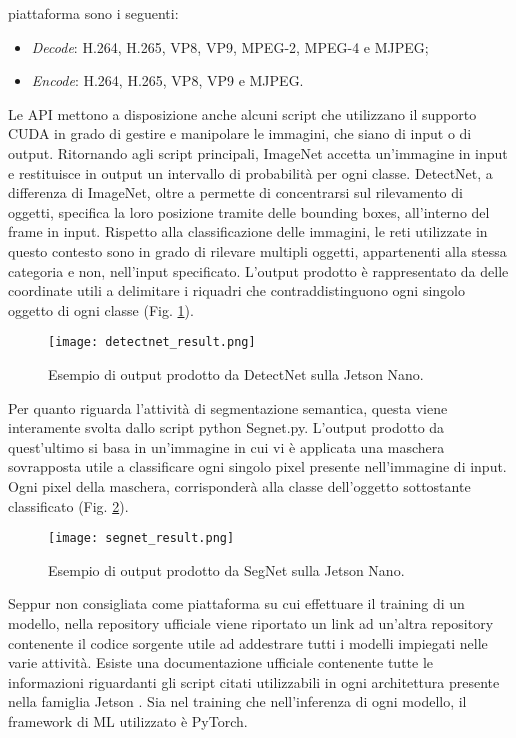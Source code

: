 piattaforma sono i seguenti:
\begin{itemize}
    \item \emph{Decode}: H.264, H.265, VP8, VP9, MPEG-2, MPEG-4 e MJPEG;
    \item \emph{Encode}: H.264, H.265, VP8, VP9 e MJPEG.
\end{itemize}
Le API mettono a disposizione anche alcuni script che utilizzano il supporto 
CUDA in grado di gestire e manipolare le immagini, che siano di input o 
di output. Ritornando agli script principali, ImageNet accetta un'immagine 
in input e restituisce in output un intervallo di probabilità per ogni classe. 
DetectNet, a differenza di ImageNet, oltre a permette di concentrarsi sul rilevamento 
di oggetti, specifica la loro posizione tramite delle bounding boxes, 
all'interno del frame in input. Rispetto alla classificazione delle immagini, 
le reti utilizzate in questo contesto sono in grado di rilevare multipli oggetti, 
appartenenti alla stessa categoria e non, nell'input specificato. L'output 
prodotto è rappresentato da delle coordinate utili a delimitare i riquadri che 
contraddistinguono ogni singolo oggetto di ogni classe (Fig. \ref{detectnet_result}).
\begin{figure}
    \centering
    \texttt{[image: detectnet\_result.png]}
    \centering
    \caption{Esempio di output prodotto da DetectNet sulla Jetson Nano.}
    \label{detectnet_result}
\end{figure}
Per quanto 
riguarda l'attività di segmentazione semantica, questa viene interamente 
svolta dallo script python Segnet.py. L'output prodotto da quest'ultimo si 
basa in un'immagine in cui vi è applicata una maschera sovrapposta utile a 
classificare ogni singolo pixel presente nell'immagine di input. Ogni pixel 
della maschera, corrisponderà alla classe dell'oggetto sottostante classificato 
(Fig. \ref{segnet_result}).
\begin{figure}
    \centering
    \texttt{[image: segnet\_result.png]}
    \centering
    \caption{Esempio di output prodotto da SegNet sulla Jetson Nano.}
    \label{segnet_result}
\end{figure}
Seppur non consigliata come piattaforma su cui effettuare il 
training di un modello, nella repository ufficiale \cite{repo_jetson_nano} viene riportato un link ad 
un'altra repository \cite{repo_pytorch_training} contenente il codice sorgente utile ad addestrare tutti 
i modelli impiegati nelle varie attività. Esiste una documentazione ufficiale 
contenente tutte le informazioni riguardanti gli script citati utilizzabili in 
ogni architettura presente nella famiglia Jetson \cite{Documentation_jetson}. Sia nel training che 
nell'inferenza di ogni modello, il framework di ML utilizzato è PyTorch.

